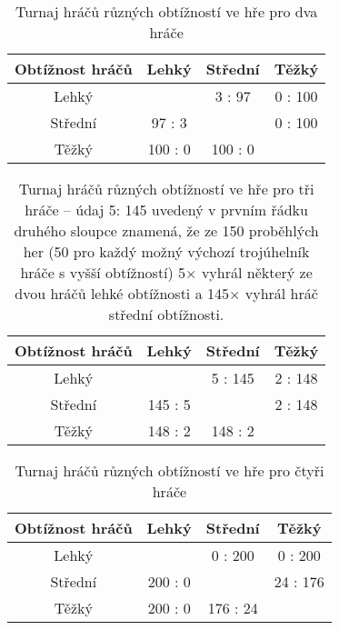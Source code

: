 \begin{table}
	\centering
	\caption{Turnaj hráčů různých obtížností ve hře pro dva hráče}
	\label{tab:TurnajDvaHraci}
	\begin{tabular}{cccc}
		\toprule
		Obtížnost hráčů & \multicolumn{1}{c}{Lehký} & \multicolumn{1}{c}{Střední} & \multicolumn{1}{c}{Těžký}\\
		\midrule
		Lehký & \faTimes & 3 : 97 & 0 : 100\\
		Střední & 97 : 3 & \faTimes & 0 : 100\\
		Těžký & 100 : 0 & 100 : 0 & \faTimes\\
		\bottomrule
	\end{tabular}
\end{table}

\begin{table}
	\centering
	\caption[Turnaj hráčů různých obtížností ve hře pro tři hráče]{Turnaj hráčů různých obtížností ve hře pro tři hráče -- údaj 5: 145 uvedený v prvním řádku druhého sloupce znamená, že ze 150 proběhlých her (50 pro každý možný výchozí trojúhelník hráče s vyšší obtížností) 5$\times$ vyhrál některý ze dvou hráčů lehké obtížnosti a 145$\times$ vyhrál hráč střední obtížnosti.}
	\label{tab:TurnajTriHraci}
	\begin{tabular}{cccc}
		\toprule
		Obtížnost hráčů & \multicolumn{1}{c}{Lehký} & \multicolumn{1}{c}{Střední} & \multicolumn{1}{c}{Těžký}\\
		\midrule
		Lehký & \faTimes & 5 : 145 & 2 : 148\\
		Střední & 145 : 5 & \faTimes & 2 : 148\\
		Těžký & 148 : 2 & 148 : 2 & \faTimes\\
		\bottomrule
	\end{tabular}
\end{table}

\begin{table}
	\centering
	\caption{Turnaj hráčů různých obtížností ve hře pro čtyři hráče}
	\label{tab:TurnajCtyriHraci}
	\begin{tabular}{cccc}
		\toprule
		Obtížnost hráčů & \multicolumn{1}{c}{Lehký} & \multicolumn{1}{c}{Střední} & \multicolumn{1}{c}{Těžký}\\
		\midrule
		Lehký & \faTimes & 0 : 200 & 0 : 200\\
		Střední & 200 : 0 & \faTimes & 24 : 176\\
		Těžký & 200 : 0 & 176 : 24 & \faTimes\\
		\bottomrule
	\end{tabular}
\end{table}

